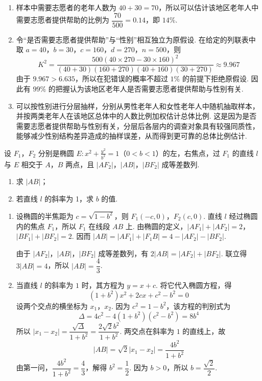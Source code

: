 \begin{solution}
\begin{enumerate}
\item 样本中需要志愿者的老年人数为 \(40+30=70\)，所以可以估计该地区老年人中需要志愿者提供帮助的比例为
\(\dfrac{70}{500}=0.14\)，即 \(14\%\).

\item 令“是否需要志愿者提供帮助”与“性别”相互独立为原假设. 在给定的列联表中取 \(a=40\)，\(b=30\)，\(c=160\)，\(d=270\)，\(n=500\)，则
\[
K^2=\frac{500(40\times270-30\times160)^2}{(40+30)(160+270)(40+160)(30+270)}
\approx9.967
\]
由于 \(9.967>6.635\)，所以在犯错误的概率不超过 \(1\%\) 的前提下拒绝原假设. 因此有 \(99\%\) 的把握认为该地区老年人是否需要志愿者提供帮助与性别有关.

\item 可以按性别进行分层抽样，分别从男性老年人和女性老年人中随机抽取样本，并按两类老年人在该地区总体中的人数比例加权估计总体比例. 这是因为是否需要志愿者提供帮助与性别有关，分层后各层内的调查对象具有较强同质性，能够减少性别结构差异造成的抽样误差，从而得到更可靠的总体比例估计.
\end{enumerate}
\end{solution}

\begin{problem}
设 \(F_{1}\)，\(F_{2}\) 分别是椭圆 \(E: x^{2} + \frac{y^{2}}{b^{2}} = 1\)（\(0 < b < 1\)）的左，右焦点，过 \(F_{1}\) 的直线 \(l\) 与 \(E\) 相交于 \(A\)，\(B\) 两点，且 \(|AF_{2}|\)，\(|AB|\)，\(|BF_{2}|\) 成等差数列.

\begin{enumerate}
\item 求 \(|AB|\)；
\item 若直线 \(l\) 的斜率为 1，求 \(b\) 的值.
\end{enumerate}
\end{problem}

\begin{solution}
\begin{enumerate}
\item 设椭圆的半焦距为 \(c=\sqrt{1-b^2}\)，则 \(F_1(-c,0)\)，\(F_2(c,0)\). 直线 \(l\) 经过椭圆内的焦点 \(F_1\)，所以 \(F_1\) 在线段 \(AB\) 上. 由椭圆的定义，\(|AF_1|+|AF_2|=2\)，\(|BF_1|+|BF_2|=2\). 因而
\(|AB|=|AF_1|+|F_1B|=4-|AF_2|-|BF_2|\).

由于 \(|AF_2|\)，\(|AB|\)，\(|BF_2|\) 成等差数列，有 \(2|AB|=|AF_2|+|BF_2|\). 联立得 \(3|AB|=4\)，所以 \(|AB|=\dfrac{4}{3}\).

\item 当直线 \(l\) 的斜率为 \(1\) 时，其方程为 \(y=x+c\). 将它代入椭圆方程，得
\[
(1+b^2)x^2+2cx+c^2-b^2=0
\]
设两个交点的横坐标为 \(x_1\)，\(x_2\). 因为 \(c^2=1-b^2\)，该方程的判别式为
\[
\Delta=4c^2-4(1+b^2)(c^2-b^2)=8b^4
\]
所以 \(|x_1-x_2|=\dfrac{\sqrt{\Delta}}{1+b^2}=\dfrac{2\sqrt{2}b^2}{1+b^2}\). 两交点在斜率为 \(1\) 的直线上，故
\[
|AB|=\sqrt{2}|x_1-x_2|=\frac{4b^2}{1+b^2}
\]
由第一问，\(\dfrac{4b^2}{1+b^2}=\dfrac{4}{3}\)，解得 \(b^2=\dfrac12\). 因为 \(b>0\)，所以 \(b=\dfrac{\sqrt{2}}{2}\).
\end{enumerate}
\end{solution}


